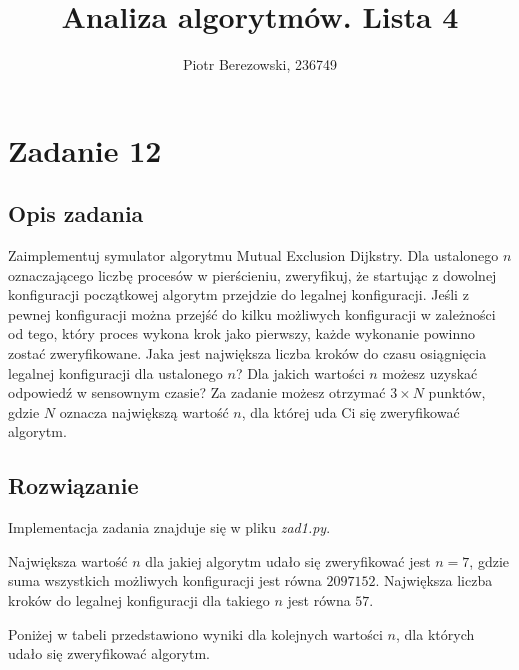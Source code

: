 \documentclass{article}
\title{Analiza algorytmów. Lista 4}
\author{Piotr Berezowski, 236749}
\begin{document}
	\maketitle
	\newpage
    

	\section{Zadanie 12}
	\subsection{Opis zadania}
    Zaimplementuj symulator algorytmu Mutual Exclusion Dijkstry. Dla ustalonego $n$ oznaczającego liczbę procesów w pierścieniu, zweryfikuj, 
    że startując z dowolnej konfiguracji początkowej algorytm przejdzie do legalnej konfiguracji. Jeśli z pewnej konfiguracji można przejść 
    do kilku możliwych konfiguracji w zależności od tego, który proces wykona krok jako pierwszy, każde wykonanie powinno zostać zweryfikowane. 
    Jaka jest największa liczba kroków do czasu osiągnięcia legalnej konfiguracji dla ustalonego $n$? Dla jakich wartości $n$ możesz uzyskać 
    odpowiedź w sensownym czasie? Za zadanie możesz otrzymać $3 \times N$ punktów, gdzie $N$ oznacza największą wartość $n$, dla której uda Ci się 
    zweryfikować algorytm.
    
    \subsection{Rozwiązanie}

    Implementacja zadania znajduje się w pliku \textit{zad1.py}. 

    Największa wartość $n$ dla jakiej algorytm udało się zweryfikować jest $n = 7$, gdzie suma wszystkich możliwych konfiguracji 
    jest równa $2097152$. Największa liczba kroków do legalnej konfiguracji dla takiego 
    $n$ jest równa $57$.

    Poniżej w tabeli przedstawiono wyniki dla kolejnych wartości $n$, dla których udało się zweryfikować algorytm.
\end{document}
